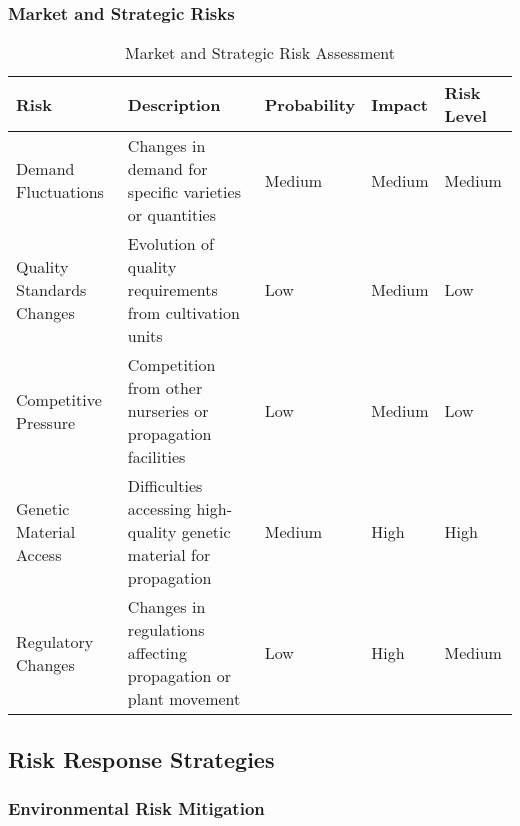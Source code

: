 \subsubsection{Market and Strategic Risks}

\begin{table}[h]
\centering
\begin{tabular}{|p{3cm}|p{4cm}|p{2cm}|p{2cm}|p{3cm}|}
\hline
\textbf{Risk} & \textbf{Description} & \textbf{Probability} & \textbf{Impact} & \textbf{Risk Level} \\
\hline
Demand Fluctuations & Changes in demand for specific varieties or quantities & Medium & Medium & Medium \\
\hline
Quality Standards Changes & Evolution of quality requirements from cultivation units & Low & Medium & Low \\
\hline
Competitive Pressure & Competition from other nurseries or propagation facilities & Low & Medium & Low \\
\hline
Genetic Material Access & Difficulties accessing high-quality genetic material for propagation & Medium & High & High \\
\hline
Regulatory Changes & Changes in regulations affecting propagation or plant movement & Low & High & Medium \\
\hline
\end{tabular}
\caption{Market and Strategic Risk Assessment}
\end{table}

\subsection{Risk Response Strategies}

\subsubsection{Environmental Risk Mitigation}

